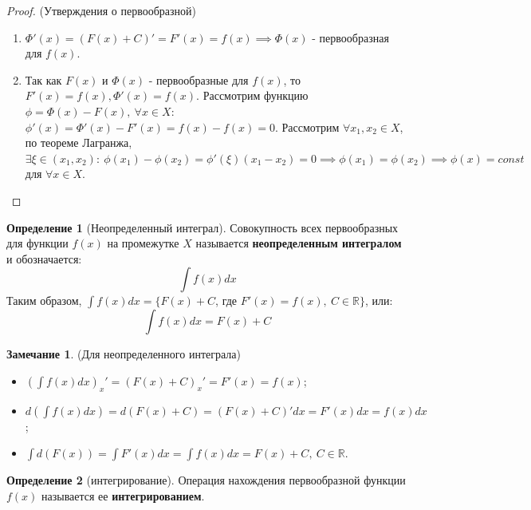 \documentclass{report}
\theoremstyle{definition}
\newtheorem{definition}{Определение}[section]
\newtheorem*{remark}{Замечание}
\begin{document}
\begin{proof}
  (Утверждения о первообразной)
  \begin{enumerate}
    \item \(\Phi'(x) = (F(x) + C)' = F'(x) = f(x) \implies \Phi(x)\)
          - первообразная для \(f(x)\).
    \item Так как \(F(x)\) и \(\Phi(x)\) - первообразные для \(f(x)\), то \(F'(x) = f(x),
          \Phi'(x) = f(x)\). Рассмотрим функцию \(\phi = \Phi(x) - F(x), \ \forall x \in X\):
          \(\phi'(x) = \Phi'(x) - F'(x) = f(x) - f(x) = 0\). Рассмотрим
          \(\forall x_{1}, x_{2} \in X\), по теореме Лагранжа, \(\exists \xi \in (x_{1}, x_{2}):
          \ \phi(x_{1}) - \phi(x_{2}) = \phi'(\xi)(x_{1} - x_{2}) = 0 \implies \phi(x_{1}) =
          \phi(x_{2}) \implies \phi(x) = const\) для \(\forall x \in X\).
  \end{enumerate}
\end{proof}

\begin{definition}[Неопределенный интеграл]
  Совокупность всех первообразных для функции \(f(x)\) на промежутке \(X\) называется
  \textbf{неопределенным интегралом} и обозначается:
  \begin{equation*}
    \int f(x) dx
  \end{equation*}
  Таким образом, \(\int f(x) dx = \{F(x) + C\), где \(F'(x) = f(x), \ C \in \mathbb{R}\}\),
  или:
  \begin{equation*}
    \int f(x) dx = F(x) + C
  \end{equation*}
\end{definition}

\begin{remark}
  (Для неопределенного интеграла)
  \begin{itemize}
    \item \((\int f(x) dx)_{x}' = (F(x) + C)_{x}' = F'(x) = f(x)\);
    \item \(d(\int f(x) dx) = d(F(x) + C) = (F(x) + C)' dx = F'(x) dx = f(x) dx\);
    \item \(\int d(F(x)) = \int F'(x) dx = \int f(x) dx = F(x) + C, \ C \in \mathbb{R}\).
  \end{itemize}
\end{remark}

\begin{definition}[интегрирование]
  Операция нахождения первообразной функции \(f(x)\) называется ее \textbf{интегрированием}.
\end{definition}
\end{document}
